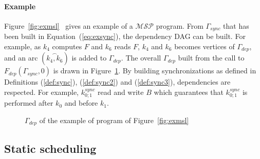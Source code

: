 \paragraph{\textbf{Example}} Figure~\ref{fig:exmsl}~ gives an example of a $\mathcal{MSP}$ program. From $\Gamma_{sync}$ that has been built in Equation~(\ref{eq:exsync}), the dependency DAG can be built. For example, as $k_4$ computes $F$ and $k_6$ reads $F$, $k_4$ and $k_6$ becomes vertices of $\Gamma_{dep}$, and an arc $(\overset{\frown}{k_4,k_6})$ is added to $\Gamma_{dep}$. The overall $\Gamma_{dep}$ built from the call to $F_{dep}(\Gamma_{sync},0)$ is drawn in Figure~\ref{fig:depdep}. By building synchronizations as defined in Definitions (\ref{def:sync}), (\ref{def:sync2}) and (\ref{def:sync3}), dependencies are respected. For example, $k_{0;1}^{sync}$ read and write $B$ which guarantees that $k_{0;1}^{sync}$ is performed after $k_0$ and before $k_1$.
\begin{figure}[h!]
\begin{center}
\caption{$\Gamma_{dep}$ of the example of program of Figure~\ref{fig:exmsl}}
\label{fig:depdep}
\end{center}
\end{figure}

\subsection{Static scheduling}
\label{sect:tsp}

